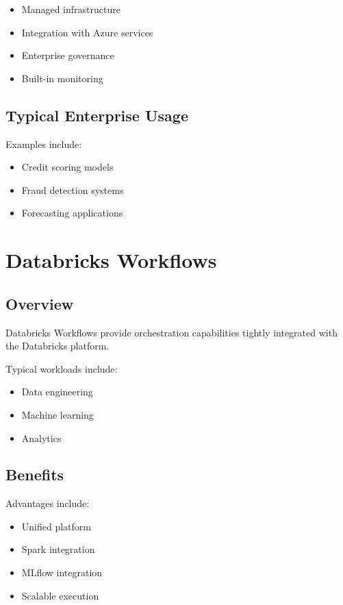 \begin{itemize}
    \item Managed infrastructure
    \item Integration with Azure services
    \item Enterprise governance
    \item Built-in monitoring
\end{itemize}

\subsection{Typical Enterprise Usage}

Examples include:

\begin{itemize}
    \item Credit scoring models
    \item Fraud detection systems
    \item Forecasting applications
\end{itemize}

\section{Databricks Workflows}

\subsection{Overview}

Databricks Workflows provide orchestration capabilities tightly integrated with the Databricks platform.

Typical workloads include:

\begin{itemize}
    \item Data engineering
    \item Machine learning
    \item Analytics
\end{itemize}

\subsection{Benefits}

Advantages include:

\begin{itemize}
    \item Unified platform
    \item Spark integration
    \item MLflow integration
    \item Scalable execution
\end{itemize}

